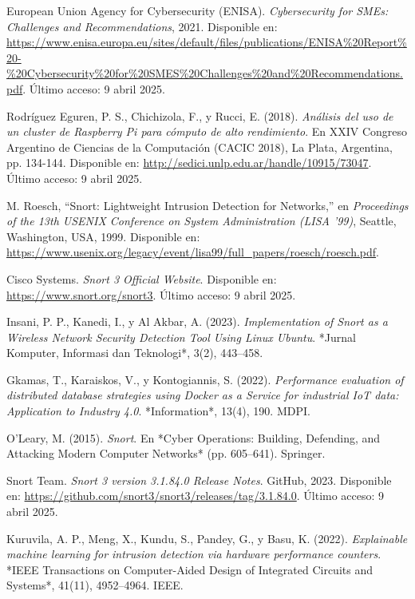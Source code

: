 \documentclass[11pt,a4paper,twoside]{report}
\begin{document}
\begin{thebibliography}{34}
	
	European Union Agency for Cybersecurity (ENISA). \textit{Cybersecurity for SMEs: Challenges and Recommendations}, 2021. Disponible en: \url{https://www.enisa.europa.eu/sites/default/files/publications/ENISA%20Report%20-%20Cybersecurity%20for%20SMES%20Challenges%20and%20Recommendations.pdf}. Último acceso: 9 abril 2025.
	
	Rodríguez Eguren, P. S., Chichizola, F., y Rucci, E. (2018). \textit{Análisis del uso de un cluster de Raspberry Pi para cómputo de alto rendimiento}. En XXIV Congreso Argentino de Ciencias de la Computación (CACIC 2018), La Plata, Argentina, pp. 134-144. Disponible en: \url{http://sedici.unlp.edu.ar/handle/10915/73047}. Último acceso: 9 abril 2025.
	
	M. Roesch, ``Snort: Lightweight Intrusion Detection for Networks,'' en \textit{Proceedings of the 13th USENIX Conference on System Administration (LISA '99)}, Seattle, Washington, USA, 1999. Disponible en: \url{https://www.usenix.org/legacy/event/lisa99/full_papers/roesch/roesch.pdf}.
	
	Cisco Systems. \textit{Snort 3 Official Website}. Disponible en: \url{https://www.snort.org/snort3}. Último acceso: 9 abril 2025.
	
	Insani, P. P., Kanedi, I., y Al Akbar, A. (2023). \textit{Implementation of Snort as a Wireless Network Security Detection Tool Using Linux Ubuntu}. *Jurnal Komputer, Informasi dan Teknologi*, 3(2), 443--458.
	
	Gkamas, T., Karaiskos, V., y Kontogiannis, S. (2022). \textit{Performance evaluation of distributed database strategies using Docker as a Service for industrial IoT data: Application to Industry 4.0}. *Information*, 13(4), 190. MDPI.
	
	O'Leary, M. (2015). \textit{Snort}. En *Cyber Operations: Building, Defending, and Attacking Modern Computer Networks* (pp. 605--641). Springer.
	
	Snort Team. \textit{Snort 3 version 3.1.84.0 Release Notes}. GitHub, 2023. Disponible en: \url{https://github.com/snort3/snort3/releases/tag/3.1.84.0}. Último acceso: 9 abril 2025.
	
	Kuruvila, A. P., Meng, X., Kundu, S., Pandey, G., y Basu, K. (2022). \textit{Explainable machine learning for intrusion detection via hardware performance counters}. *IEEE Transactions on Computer-Aided Design of Integrated Circuits and Systems*, 41(11), 4952--4964. IEEE.
	

\end{thebibliography}
\end{document}
